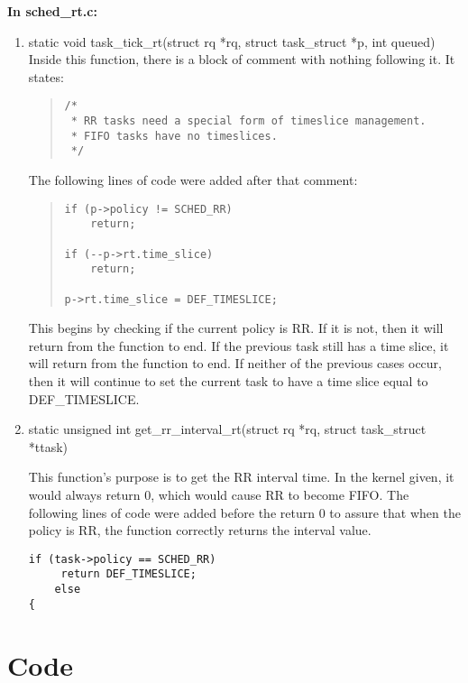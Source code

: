 \documentclass[letterpaper,10pt,titlepage]{article}
\begin{document}
{\bfseries In sched\_rt.c:}

\begin{enumerate}[resume]
\item static void task\_tick\_rt(struct rq *rq, struct task\_struct *p, int queued)
Inside this function, there is a block of comment with nothing following it. It states:
\begin{quotation}
\begin{verbatim}
/*
 * RR tasks need a special form of timeslice management.
 * FIFO tasks have no timeslices.
 */
\end{verbatim}
\end{quotation}
The following lines of code were added after that comment:
\begin{quotation}
\begin{verbatim}
if (p->policy != SCHED_RR)
    return;

if (--p->rt.time_slice)
    return;

p->rt.time_slice = DEF_TIMESLICE;
\end{verbatim}
\end{quotation}
This begins by checking if the current policy is RR. If it is not, then it will return from the function to end. If the previous task still has a time slice, it will return from the function to end. If neither of the previous cases occur, then it will continue to set the current task to have a time slice equal to DEF\_TIMESLICE.


\item static unsigned int get\_rr\_interval\_rt(struct rq *rq, struct task\_struct *ttask)

    This function's purpose is to get the RR interval time. In the kernel given, it would always return 0, which would cause
    RR to become FIFO. The following lines of code were added before the return 0 to assure that when the policy is RR, the
    function correctly returns the interval value.
\begin{verbatim}
if (task->policy == SCHED_RR)
     return DEF_TIMESLICE;
    else
{
\end{verbatim}
\end{enumerate}

\section{Code}

\end{document}
